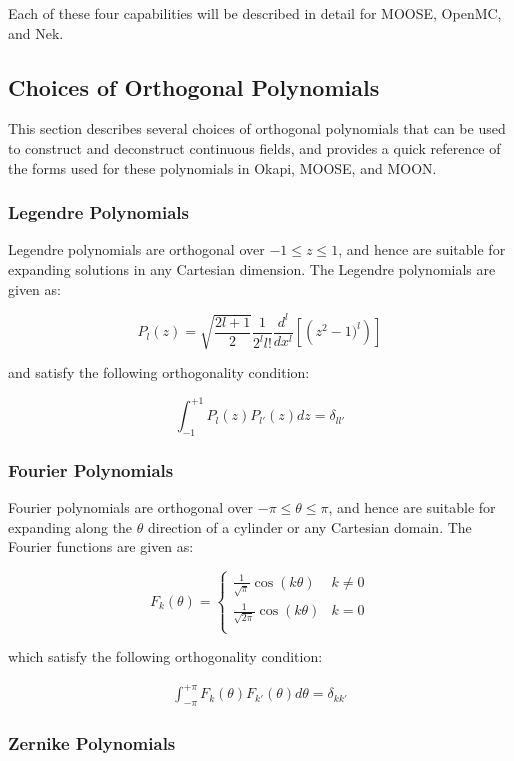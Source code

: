 \documentclass[10pt]{article}
\newcommand{\beq}{\begin{equation}}
\newcommand{\eeq}{\end{equation}}
\newcommand{\beqa}{\begin{equation}\begin{aligned}}
\newcommand{\eeqa}{\end{aligned}\end{equation}}
\numberwithin{equation}{section} %
\begin{document}
Each of these four capabilities will be described in detail for MOOSE, OpenMC, and Nek. 

\subsection{Choices of Orthogonal Polynomials}
\label{sec:Polynomials}
This section describes several choices of orthogonal polynomials that can be used to construct and deconstruct continuous fields, and provides a quick reference of the forms used for these polynomials in Okapi, MOOSE, and MOON.

\subsubsection{Legendre Polynomials}

Legendre polynomials are orthogonal over \( -1 \leq z \leq 1\), and hence are suitable for expanding solutions in any Cartesian dimension. The Legendre polynomials are given as:

\beq
\label{eq:LegendreScaled}
P_l(z)=\sqrt{\frac{2l+1}{2}}\frac{1}{2^ll!}\frac{d^l}{dx^l}\left\lbrack\left(z^2-1)^l\right)\right\rbrack
\eeq

and satisfy the following orthogonality condition:

\beq
\label{eq:LegendreScaledOrthogonality}
\int_{-1}^{+1}P_l(z)P_{l'}(z)dz=\delta_{ll'}
\eeq

\subsubsection{Fourier Polynomials}

Fourier polynomials are orthogonal over \(-\pi\leq\theta\leq\pi\), and hence are suitable for expanding along the \(\theta\) direction of a cylinder or any Cartesian domain. The Fourier functions are given as:

\beq
\label{eq:FourierScaled}
F_k(\theta)=
\begin{cases}
\frac{1}{\sqrt{\pi}}\cos{(k\theta)} & k \neq 0\\
\frac{1}{\sqrt{2\pi}}\cos{(k\theta)} & k = 0\\
\end{cases}
\eeq

which satisfy the following orthogonality condition:

\beqa
\label{eq:FourierOrthogonal}
\int_{-\pi}^{+\pi}F_k(\theta)F_{k'}(\theta)d\theta=\delta_{kk'}
\eeqa

\subsubsection{Zernike Polynomials}
\end{document}

